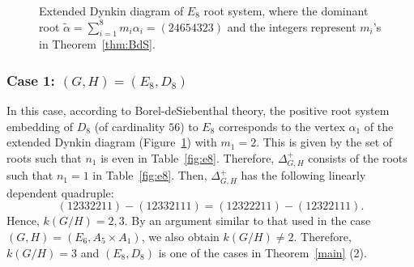 \documentclass{amsart}
\theoremstyle{definition}
\theoremstyle{remark}
\numberwithin{equation}{section}
\begin{document}
\begin{figure}[h]
\centering
{}
\caption{Extended Dynkin diagram of $E_{8}$ root system, where the dominant root $\widetilde{\alpha}=\sum_{i=1}^{8}m_{i}\alpha_{i}=(24654323)$ and the integers represent $m_{i}$'s in Theorem~\ref{thm:BdS}.}\label{fig:e8dd}
\end{figure}

\subsubsection{Case 1: $(G,H)=(E_{8},D_8)$}
\label{sect:9.3.1}
In this case, according to Borel-deSiebenthal theory,
the positive root system embedding of $D_{8}$ (of cardinality $56$) to $E_{8}$ corresponds to the vertex $\alpha_{1}$ of the extended Dynkin diagram (Figure~\ref{fig:e8dd}) with $m_{1}=2$.
This is given by the set of roots such that $n_{1}$ is even in Table~\ref{fig:e8}. 
Therefore, $\Delta_{G,H}^{+}$ consists of the roots such that $n_{1}=1$ in Table~\ref{fig:e8}.
Then, $\Delta^{+}_{G,H}$ has the following linearly dependent quadruple:
\[
(12332211)-(12332111)=(12322211)-(12322111).
\]
Hence, $k(G/H)=2,3$.
By an argument similar to that used in the case $(G,H)=(E_{6},A_{5}\times A_{1})$, we also obtain $k(G/H)\not=2$.
Therefore, $k(G/H)=3$ and $(E_{8},D_{8})$ is one of the cases in Theorem~\ref{main} (2).
\end{document}
